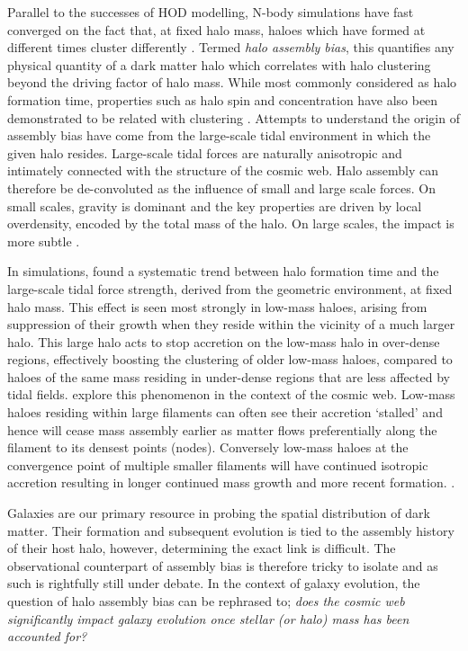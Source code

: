 Parallel to the successes of HOD modelling, N-body simulations have fast converged on the fact that, at fixed halo mass, haloes which have formed at different times cluster differently \citep[e.g.][]{gao2005,wechsler2006,croton2007,wang2011}. Termed \textit{halo assembly bias}, this quantifies any physical quantity of a dark matter halo which correlates with halo clustering beyond the driving factor of halo mass. While most commonly considered as halo formation time, properties such as halo spin and concentration have also been demonstrated to be related with clustering \citep[e.g.][]{lacerna2012,lehmann2017}. 
Attempts to understand the origin of assembly bias have come from the large-scale tidal environment in which the given halo resides. Large-scale tidal forces are naturally anisotropic and intimately connected with the structure of the cosmic web. Halo assembly can therefore be de-convoluted as the influence of small and large scale forces. On small scales, gravity is dominant and the key properties are driven by local overdensity, encoded by the total mass of the halo. On large scales, the impact is more subtle .

In simulations, \citet{hahn2009} found a systematic trend between halo formation time and the large-scale tidal force strength, derived from the geometric environment, at fixed halo mass. This effect is seen most strongly in low-mass haloes, arising from suppression of their growth when they reside within the vicinity of a much larger halo. This large halo acts to stop accretion on the low-mass halo in over-dense regions, effectively boosting the clustering of older low-mass haloes, compared to haloes of the same mass residing in under-dense regions that are less affected by tidal fields. \citet{ZOMGI} explore this phenomenon in the context of the cosmic web. Low-mass haloes residing within large filaments can often see their accretion `stalled' and hence will cease mass assembly earlier as matter flows preferentially along the filament to its densest points (nodes). Conversely low-mass haloes at the convergence point of multiple smaller filaments will have continued isotropic accretion resulting in longer continued mass growth and more recent formation. \citep[See][for a theoretical approach]{musso2018}.

Galaxies are our primary resource in probing the spatial distribution of dark matter. Their formation and subsequent evolution is tied to the assembly history of their host halo, however, determining the exact link is difficult. The observational counterpart of assembly bias is therefore tricky to isolate and as such is rightfully still under debate. In the context of galaxy evolution, the question of halo assembly bias can be rephrased to; \textit{does the cosmic web significantly impact galaxy evolution once stellar (or halo) mass has been accounted for?}

